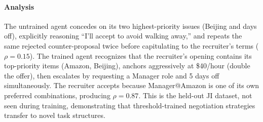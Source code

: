 \documentclass{interact}
\theoremstyle{plain}
\theoremstyle{definition}
\theoremstyle{remark}
\begin{document}
\paragraph{Analysis} The untrained agent concedes on its two highest-priority issues (Beijing and days off), explicitly reasoning ``I'll accept to avoid walking away,'' and repeats the same rejected counter-proposal twice before capitulating to the recruiter's terms ($\rho = 0.15$). The trained agent recognizes that the recruiter's opening contains its top-priority items (Amazon, Beijing), anchors aggressively at \$40/hour (double the offer), then escalates by requesting a Manager role and 5 days off simultaneously. The recruiter accepts because Manager@Amazon is one of its own preferred combinations, producing $\rho = 0.87$. This is the held-out JI dataset, not seen during training, demonstrating that threshold-trained negotiation strategies transfer to novel task structures.
\end{document}
